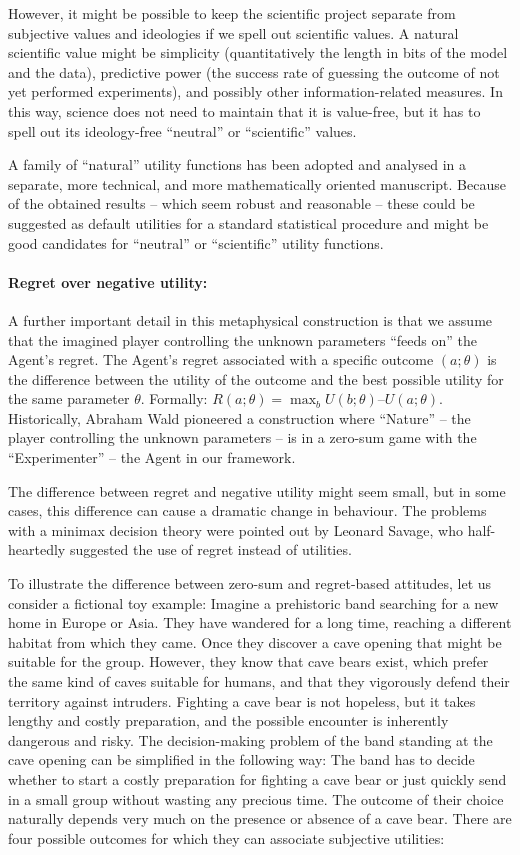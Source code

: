 \documentclass{article}
\begin{document}
However, it might be possible to keep the scientific project separate from subjective values and ideologies if we spell out scientific values. A natural scientific value might be simplicity (quantitatively the length in bits of the model and the data), predictive power (the success rate of guessing the outcome of not yet performed experiments), and possibly other information-related measures. In this way, science does not need to maintain that it is value-free, but it has to spell out its ideology-free ``neutral'' or ``scientific'' values.

A family of ``natural'' utility functions has been adopted and analysed in a separate, more technical, and more mathematically oriented manuscript. Because of the obtained results – which seem robust and reasonable – these could be suggested as default utilities for a standard statistical procedure and might be good candidates for ``neutral'' or ``scientific'' utility functions.

\paragraph{Regret over negative utility:}
A further important detail in this metaphysical construction is that we assume that the imagined player controlling the unknown parameters ``feeds on'' the Agent’s regret.
The Agent’s regret associated with a specific outcome $(a;\theta)$ is the difference between the utility of the outcome and the best possible utility for the same parameter $\theta$. Formally: $R(a;\theta) = \max_{b} U(b;\theta) – U(a;\theta)$.
Historically, Abraham Wald pioneered a construction where ``Nature'' – the player controlling the unknown parameters – is in a zero-sum game with the ``Experimenter'' – the Agent in our framework.

The difference between regret and negative utility might seem small, but in some cases, this difference can cause a dramatic change in behaviour.
The problems with a minimax decision theory were pointed out by Leonard Savage, who half-heartedly suggested the use of regret instead of utilities.

To illustrate the difference between zero-sum and regret-based attitudes, let us consider a fictional toy example:
Imagine a prehistoric band searching for a new home in Europe or Asia. They have wandered for a long time, reaching a different habitat from which they came. Once they discover a cave opening that might be suitable for the group. However, they know that cave bears exist, which prefer the same kind of caves suitable for humans, and that they vigorously defend their territory against intruders.
Fighting a cave bear is not hopeless, but it takes lengthy and costly preparation, and the possible encounter is inherently dangerous and risky.
The decision-making problem of the band standing at the cave opening can be simplified in the following way:
The band has to decide whether to start a costly preparation for fighting a cave bear or just quickly send in a small group without wasting any precious time.
The outcome of their choice naturally depends very much on the presence or absence of a cave bear.
There are four possible outcomes for which they can associate subjective utilities:
\end{document}
